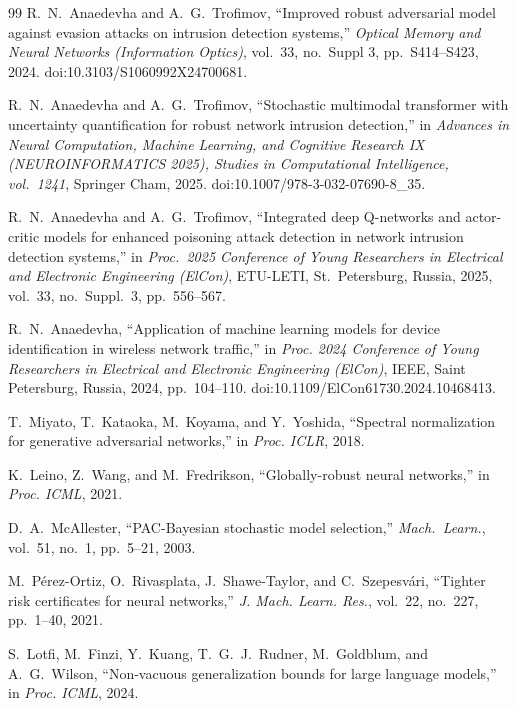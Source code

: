 \documentclass[12pt,a4paper]{article}
\theoremstyle{definition}
\theoremstyle{remark}
\begin{document}
\begin{thebibliography}{99}
R.~N.~Anaedevha and A.~G.~Trofimov, ``Improved robust adversarial model against evasion attacks on intrusion detection systems,'' \emph{Optical Memory and Neural Networks (Information Optics)}, vol.~33, no.~Suppl 3, pp.~S414--S423, 2024. doi:10.3103/S1060992X24700681.

R.~N.~Anaedevha and A.~G.~Trofimov, ``Stochastic multimodal transformer with uncertainty quantification for robust network intrusion detection,'' in \emph{Advances in Neural Computation, Machine Learning, and Cognitive Research IX (NEUROINFORMATICS 2025), Studies in Computational Intelligence, vol.~1241}, Springer Cham, 2025. doi:10.1007/978-3-032-07690-8\_35.

R.~N.~Anaedevha and A.~G.~Trofimov, ``Integrated deep Q-networks and actor-critic models for enhanced poisoning attack detection in network intrusion detection systems,'' in \emph{Proc.~2025 Conference of Young Researchers in Electrical and Electronic Engineering (ElCon)}, ETU-LETI, St.~Petersburg, Russia, 2025, vol.~33, no.~Suppl.~3, pp.~556--567.

R.~N.~Anaedevha, ``Application of machine learning models for device identification in wireless network traffic,'' in \emph{Proc. 2024 Conference of Young Researchers in Electrical and Electronic Engineering (ElCon)}, IEEE, Saint Petersburg, Russia, 2024, pp.~104--110. doi:10.1109/ElCon61730.2024.10468413.

T.~Miyato, T.~Kataoka, M.~Koyama, and Y.~Yoshida, ``Spectral normalization for generative adversarial networks,'' in \emph{Proc. ICLR}, 2018.

K.~Leino, Z.~Wang, and M.~Fredrikson, ``Globally-robust neural networks,'' in \emph{Proc. ICML}, 2021.

D.~A.~McAllester, ``{PAC}-Bayesian stochastic model selection,'' \emph{Mach.\ Learn.}, vol.~51, no.~1, pp.~5--21, 2003.

M.~P\'erez-Ortiz, O.~Rivasplata, J.~Shawe-Taylor, and C.~Szepesv\'ari, ``Tighter risk certificates for neural networks,'' \emph{J. Mach. Learn. Res.}, vol.~22, no.~227, pp.~1--40, 2021.

S.~Lotfi, M.~Finzi, Y.~Kuang, T.~G.~J.~Rudner, M.~Goldblum, and A.~G.~Wilson, ``Non-vacuous generalization bounds for large language models,'' in \emph{Proc. ICML}, 2024.


\end{thebibliography}
\end{document}
